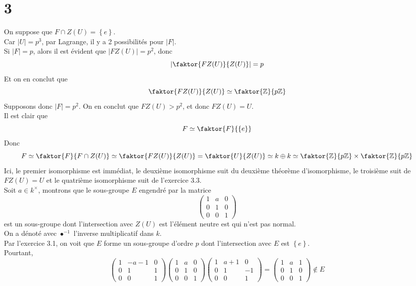 \documentclass[11pt, a4paper]{article}
\newcommand{\zpz}{\faktor{\mathbb{Z}}{p \mathbb{Z}}}
\begin{document}
\section*{3}
On suppose que $F\cap Z( U) = \left\{ e  \right\} $.\\

Car $|U|= p^{3}$, par Lagrange, il y a 2 possibilités pour $|F|$.\\
Si $|F|=p$, alors il est évident que $|FZ( U)| = p^{2} $, donc
\[ 
	| \faktor { FZ( U)  } { Z( U) } | = p
\]
Et on en conclut que
\[ 
\faktor { FZ( U)  } { Z( U) }\simeq \zpz
\]
Supposons donc $|F|=p^{2}$.
On en conclut que $FZ( U) >p^{2}$, et donc $FZ( U) = U$.\\

Il est clair que 
\[ 
F \simeq \faktor { F}  { \left\{ e  \right\} } 
\]
Donc
\[ 
	F  \simeq \faktor { F}  { F \cap Z( U)  } \simeq \faktor { F Z( U) } { Z( U) } = \faktor { U} { Z( U) } \simeq k \oplus k \simeq \zpz\times\zpz
\]
Ici, le premier isomorphisme est immédiat, le deuxième isomorphisme suit du deuxième théorème d'isomorphisme, le troisième suit de  $FZ( U) = U$ et le quatrième isomorphisme suit de l'exercice 3.3.\\

Soit $a\in k^{\times}$, montrons que le sous-groupe $E$ engendré par la matrice
\[ 
\begin{pmatrix}
	1 & a & 0\\
	0 & 1 & 0\\
	0 & 0 &1
\end{pmatrix}
\]
est un sous-groupe dont l'intersection avec $Z( U) $ est l'élément neutre est qui n'est pas normal.\\
On a dénoté avec $\bullet ^{-1}$ l'inverse multiplicatif dans $k$.\\
Par l'exercice 3.1, on voit que $E$ forme un sous-groupe d'ordre $p$ dont l'intersection avec $E$ est $ \left\{ e  \right\} $.\\ 
Pourtant,
\[ 
\begin{pmatrix}
	1 & -a-1 & 0\\
	0 & 1 & 1\\
	0 & 0 &1
\end{pmatrix}
\begin{pmatrix}
	1 & a & 0\\
	0 & 1 & 0\\
	0 & 0 &1
\end{pmatrix}
\begin{pmatrix}
	1 & a+1 & 0\\
	0 & 1 & -1\\
	0 & 0 &1
\end{pmatrix}
=
\begin{pmatrix}
	1 & a & 1\\
	0 & 1 & 0\\
	0 & 0 &1
\end{pmatrix}
\notin E
\]
\end{document}
